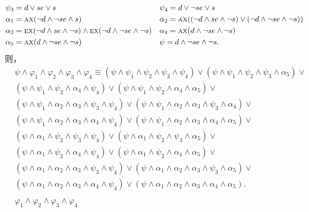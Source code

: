 \begin{example}[例1的延续]
\begin{align*}
	& \psi_3 = d \vee se \vee s && \psi_4 = d \vee \neg se \vee s\\
	& \alpha_1 = \textsc{a}\textsc{x}(\neg d \wedge \neg se \wedge s) && \alpha_2 = \textsc{a}\textsc{x}((\neg d \wedge se \wedge \neg s) \vee (\neg d \wedge \neg se\wedge \neg s))\\
	& \alpha_3 = \textsc{e}\textsc{x}(\neg d \wedge se \wedge \neg s) \wedge \textsc{e}\textsc{x} (\neg d \wedge \neg se\wedge \neg s) && \alpha_4 = \textsc{a}\textsc{x}(d \wedge \neg se \wedge \neg s)\\
	& \alpha_5 = \textsc{a}\textsc{x}(d \wedge \neg se \wedge \neg s) && \psi = d \wedge \neg se \wedge \neg s.
\end{align*}
则，
\begin{align*}
	& \psi \wedge \varphi_1 \wedge \varphi_2 \wedge \varphi_3\wedge \varphi_4
	\equiv (\psi \wedge \psi_1 \wedge \psi_2 \wedge \psi_3 \wedge \psi_4) \vee (\psi \wedge \psi_1 \wedge \psi_2 \wedge \psi_3 \wedge \alpha_5) \vee\\
	& (\psi \wedge \psi_1 \wedge \psi_2 \wedge \alpha_4 \wedge \psi_4) \vee (\psi \wedge \psi_1 \wedge \psi_2 \wedge \alpha_4 \wedge \alpha_5) \vee\\
	& (\psi \wedge \psi_1 \wedge \alpha_2 \wedge \alpha_3 \wedge \psi_3 \wedge \psi_4) \vee (\psi \wedge \psi_1 \wedge \alpha_2 \wedge \alpha_3 \wedge \psi_3 \wedge \alpha_4) \vee \\
	& (\psi \wedge \psi_1 \wedge \alpha_2 \wedge \alpha_3 \wedge \alpha_4 \wedge \psi_4) \vee (\psi \wedge \psi_1 \wedge \alpha_2 \wedge \alpha_3 \wedge \alpha_4 \wedge \alpha_5) \vee\\
	& (\psi \wedge \alpha_1 \wedge \psi_2 \wedge \psi_3 \wedge \psi_4) \vee (\psi \wedge \alpha_1 \wedge \psi_2 \wedge \psi_3 \wedge \alpha_5)\vee\\
	& (\psi \wedge \alpha_1 \wedge \psi_2 \wedge \alpha_4 \wedge \psi_4) \vee (\psi \wedge \alpha_1 \wedge \psi_2 \wedge \alpha_4 \wedge\alpha_5)\vee \\
	& (\psi \wedge \alpha_1 \wedge \alpha_2 \wedge \alpha_3 \wedge \psi_3 \wedge \psi_4) \vee (\psi \wedge \alpha_1 \wedge \alpha_2 \wedge \alpha_3\wedge \psi_3 \wedge \alpha_5) \vee \\
	& (\psi \wedge \alpha_1 \wedge \alpha_2 \wedge \alpha_3 \wedge \alpha_4 \wedge \psi_4) \vee (\psi \wedge \alpha_1 \wedge \alpha_2 \wedge \alpha_3 \wedge \alpha_4 \wedge \alpha_5).\\
	\\
	& \varphi_1 \wedge \varphi_2 \wedge \varphi_3\wedge \varphi_4

\end{align*}
\end{example}
